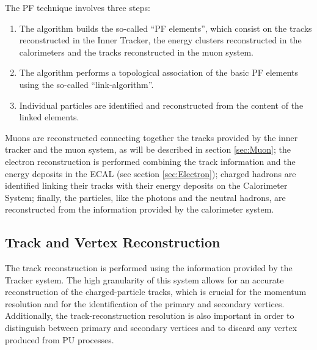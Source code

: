 \noindent The PF technique involves three steps: 

\begin{enumerate}
 \item The algorithm builds the so-called ``PF elements'', which consist on the tracks reconstructed in 
 the Inner Tracker, the energy clusters reconstructed in the calorimeters and 
 the tracks reconstructed in the muon system. 
 \item The algorithm performs a topological association of the basic PF elements 
 using the so-called ``link-algorithm''.
 \item Individual particles are identified and reconstructed from the content of the linked elements. 
\end{enumerate}

\noindent Muons are reconstructed connecting together the tracks 
provided by the inner tracker and the muon system, as will be described 
in section \ref{sec:Muon}; the electron reconstruction is performed 
combining the track information and the energy deposits in the 
ECAL (see section \ref{sec:Electron}); charged hadrons are identified linking 
their tracks with their energy deposits on the Calorimeter System; finally, the 
 particles, like the photons and the neutral hadrons, are reconstructed from the 
information provided by the calorimeter system.

\subsection{Track and Vertex Reconstruction}
\label{subsec:TrackReco}

\noindent The track reconstruction is performed using the information provided by the Tracker system. The high 
granularity of this system allows for an accurate reconstruction of the charged-particle tracks, which is 
crucial for the momentum resolution and for the identification of the primary and secondary 
vertices. Additionally, the track-reconstruction resolution is also important 
in order to distinguish between primary and secondary vertices and to discard 
any vertex produced from PU processes.\\


